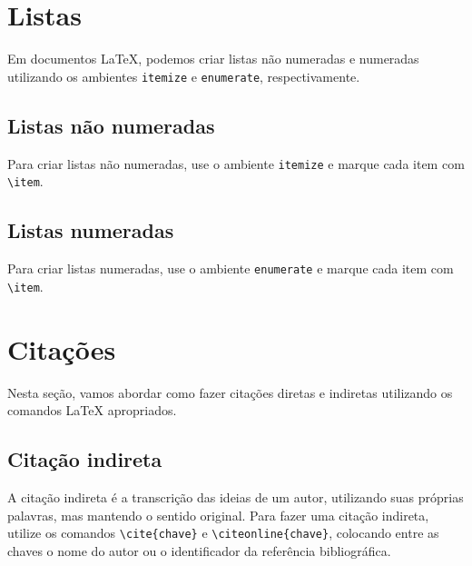 
\section{Listas}
\label{sec:listas}

Em documentos \LaTeX, podemos criar listas não numeradas e numeradas utilizando os ambientes \verb|itemize| e \verb|enumerate|, respectivamente.

\subsection{Listas não numeradas}
\label{subsec:listasNaoNumeradas}
\noindent
Para criar listas não numeradas, use o ambiente \verb|itemize| e marque cada item com \verb|\item|.



\subsection{Listas numeradas}
\label{subsec:listasNumeradas}
\noindent
Para criar listas numeradas, use o ambiente \verb|enumerate| e marque cada item com \verb|\item|.



\section{Citações}
\label{sec:citacoes}

Nesta seção, vamos abordar como fazer citações diretas e indiretas utilizando os comandos \LaTeX{} apropriados.

\subsection{Citação indireta}
\label{subsec:citacaoIndireta}

A citação indireta é a transcrição das ideias de um autor, utilizando suas próprias palavras, mas mantendo o sentido original. Para fazer uma citação indireta, utilize os comandos \verb|\cite{chave}| e \verb|\citeonline{chave}|, colocando entre as chaves o nome do autor ou o identificador da referência bibliográfica.

